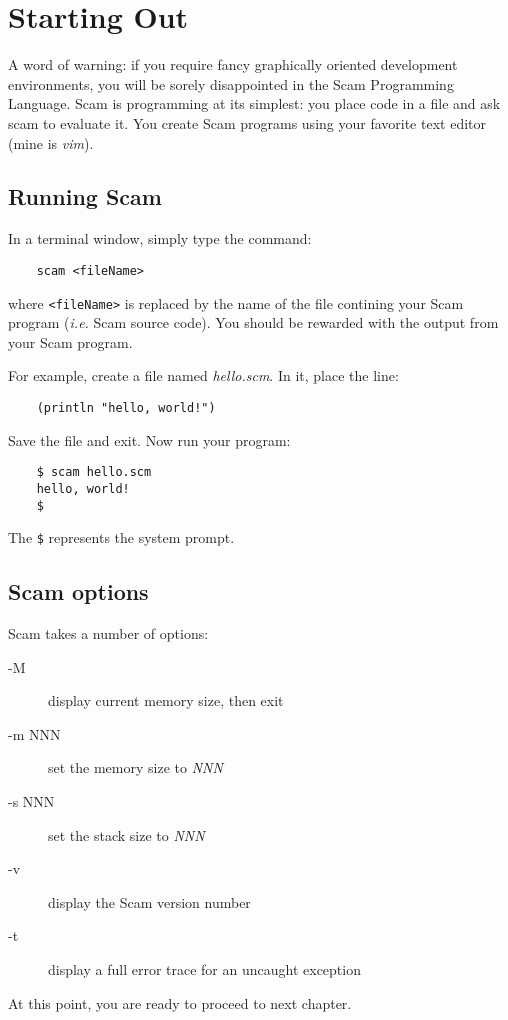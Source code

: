 \chapter{Starting Out}
\label{StartingOut}

A word of warning: if you require fancy graphically oriented development
environments, you will be sorely disappointed in the Scam Programming
Language. Scam is programming at its simplest: you place code in a file
and ask scam to evaluate it. 
You
create Scam programs using your favorite text editor (mine is {\it vim}).

\section{Running Scam}

In a terminal window, simply type the command:

\begin{verbatim}
    scam <fileName>
\end{verbatim}

where \verb!<fileName>! is replaced by the name of the file contining your
Scam program ({\it i.e.} Scam source code).
You should be rewarded with the output from your Scam program.

For example, create a file named {\it hello.scm}. In it, place the line:

\begin{verbatim}
    (println "hello, world!")
\end{verbatim}

Save the file and exit. Now run your program:

\begin{verbatim}
    $ scam hello.scm
    hello, world!
    $
\end{verbatim}

The \verb!$! represents the system prompt.

\section{Scam options}

Scam takes a number of options:

\begin{description}
\item[-M]
    
    display current memory size, then exit
    
\item[-m NNN]
    
    set the memory size to {\it NNN}
    
\item[-s NNN]

    set the stack size to {\it NNN}

\item[-v]

    display the Scam version number

\item[-t]

    display a full error trace for an uncaught exception

\end{description}

At this point, you are ready to proceed to next chapter.
